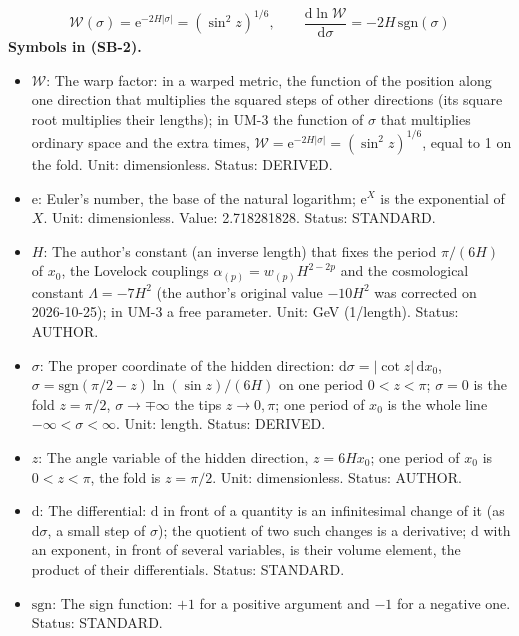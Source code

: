 \documentclass[
  10pt,
]{article}
\providecommand{\tightlist}{%
  \setlength{\itemsep}{0pt}\setlength{\parskip}{0pt}}
\begin{document}
\[
\mathcal{W}(\sigma) = \mathrm{e}^{-2H\lvert\sigma\rvert} = (\sin^2z)^{1/6},\qquad
\frac{\mathrm{d}\ln\mathcal{W}}{\mathrm{d}\sigma} = -2H\,\mathrm{sgn}(\sigma) \tag{SB-2}
\] \textbf{Symbols in (SB-2).}

\begin{itemize}
\tightlist
\item
  \(\mathcal{W}\): The warp factor: in a warped metric, the function of
  the position along one direction that multiplies the squared steps of
  other directions (its square root multiplies their lengths); in UM-3
  the function of \(\sigma\) that multiplies ordinary space and the
  extra times,
  \(\mathcal{W} = \mathrm{e}^{-2H\lvert\sigma\rvert} = (\sin^2z)^{1/6}\),
  equal to 1 on the fold. Unit: dimensionless. Status: DERIVED.
\item
  \(\mathrm{e}\): Euler's number, the base of the natural logarithm;
  \(\mathrm{e}^{X}\) is the exponential of \(X\). Unit: dimensionless.
  Value: 2.718281828. Status: STANDARD.
\item
  \(H\): The author's constant (an inverse length) that fixes the period
  \(\pi/(6H)\) of \(x_0\), the Lovelock couplings
  \(\alpha_{(p)} = w_{(p)}H^{2-2p}\) and the cosmological constant
  \(\Lambda = -7H^2\) (the author's original value \(-10H^2\) was
  corrected on 2026-10-25); in UM-3 a free parameter. Unit: GeV
  (1/length). Status: AUTHOR.
\item
  \(\sigma\): The proper coordinate of the hidden direction:
  \(\mathrm{d}\sigma = \lvert\cot z\rvert\,\mathrm{d}x_0\),
  \(\sigma = \mathrm{sgn}(\pi/2 - z)\ln(\sin z)/(6H)\) on one period
  \(0 < z < \pi\); \(\sigma = 0\) is the fold \(z = \pi/2\),
  \(\sigma \to \mp\infty\) the tips \(z \to 0, \pi\); one period of
  \(x_0\) is the whole line \(-\infty < \sigma < \infty\). Unit: length.
  Status: DERIVED.
\item
  \(z\): The angle variable of the hidden direction, \(z = 6Hx_0\); one
  period of \(x_0\) is \(0 < z < \pi\), the fold is \(z = \pi/2\). Unit:
  dimensionless. Status: AUTHOR.
\item
  \(\mathrm{d}\): The differential: \(\mathrm{d}\) in front of a
  quantity is an infinitesimal change of it (as \(\mathrm{d}\sigma\), a
  small step of \(\sigma\)); the quotient of two such changes is a
  derivative; \(\mathrm{d}\) with an exponent, in front of several
  variables, is their volume element, the product of their
  differentials. Status: STANDARD.
\item
  \(\mathrm{sgn}\): The sign function: \(+1\) for a positive argument
  and \(-1\) for a negative one. Status: STANDARD.
\end{itemize}
\end{document}
